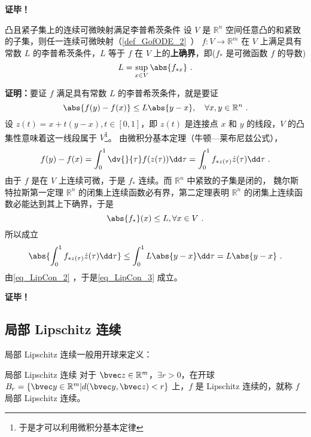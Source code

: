 \textbf{证毕！}

\begin{theorem}{凸且紧子集上的连续可微映射满足李普希茨条件}\label{the_LipCon_2}
设 $V$ 是 $\mathbb R^n$ 空间任意凸的和紧致的子集，则任一连续可微映射（\autoref{def_GofODE_2}~） $f:V\rightarrow \mathbb R^m$ 在 $V$ 上满足具有常数 $L$ 的李普希茨条件，$L$ 等于 $f$ 在 $V$ 上的\textbf{上确界}，即($f_*$ 是可微函数 $f$ 的导数)
\begin{equation}
L=\sup_{x\in V}\abs{f_{*x}}~.
\end{equation}
\end{theorem}
\textbf{证明：}要证 $f$ 满足具有常数 $L$ 的李普希茨条件，就是要证
\begin{equation}\label{eq_LipCon_3}
\abs{f(y)-f(x)}\leq L\abs{y-x},\quad\forall x,y\in\mathbb R^n~.
\end{equation}
设 $z(t)=x+t(y-x),t\in[0,1]$，即 $z(t)$ 是连接点 $x$ 和 $y$ 的线段，$V$ 的凸集性意味着这一线段属于 $V$\footnote{于是才可以利用微积分基本定律}。
由微积分基本定理（牛顿—莱布尼兹公式），
\begin{equation}\label{eq_LipCon_2}
f(y)-f(x)=\int_0^1\dv{}{\tau}f(z(\tau))\dd\tau=\int_0^1f_{*z(\tau)}\dot z(\tau)\dd\tau~.
\end{equation}
由于 $f$ 是在 $V$ 上连续可微，于是 $f_*$ 连续。而 $\mathbb R^n$ 中紧致的子集是闭的， 魏尔斯特拉斯第一定理 $\mathbb R^n$ 的闭集上连续函数必有界，第二定理表明 $\mathbb R^n$ 的闭集上连续函数必能达到其上下确界，于是
 \begin{equation}
 \abs{f_*}(x)\leq L ,\forall x\in V ~.
 \end{equation}
所以成立
\begin{equation}
\abs{\int_0^1f_{*z(\tau)}\dot z(\tau)\dd\tau}\leq\int_0^1L\abs{y-x}\dd\tau=L\abs{y-x}~.
\end{equation}
由\autoref{eq_LipCon_2} ，于是\autoref{eq_LipCon_3} 成立。

\textbf{证毕！}

\subsection{局部 Lipschitz 连续}
局部 Lipschitz 连续一般用开球来定义：
\begin{definition}{局部 Lipschitz 连续}
对于 $\bvec z \in \mathbb R^m$，$\exists r > 0$，在开球 $B_{r} = \{\bvec y \in \mathbb R^m | d(\bvec y, \bvec z) < r\}$ 上，$f$ 是 Lipschitz 连续的，就称 $f$ 局部 Lipschitz 连续。
\end{definition}
